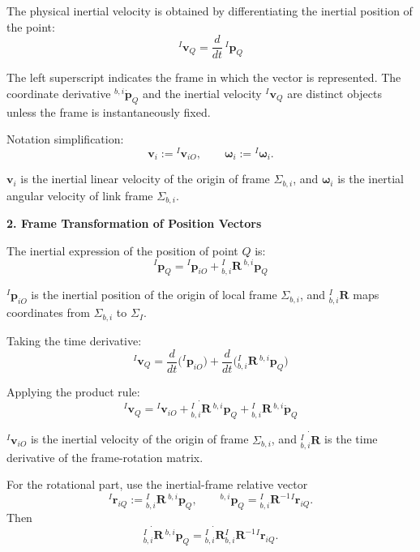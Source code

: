 \documentclass[12pt,a4paper]{report}
\newcommand{\newsymbols}[1]{\par\noindent{}#1\par\vspace{0.35em}}
\newcommand{\vect}[1]{\mathbf{#1}}
\newcommand{\Frame}[1]{\Sigma_{#1}}
\newcommand{\Rot}[2]{{}_{#1}^{#2}\mathbf{R}}
\newcommand{\angvel}{\boldsymbol{\omega}}
\begin{document}
The physical inertial velocity is obtained by differentiating the inertial position of the point:
\begin{equation}
{}^{I}\vect{v}_{Q}
=
\frac{d}{dt}\,{}^{I}\vect{p}_{Q}
\end{equation}
\newsymbols{The left superscript indicates the frame in which the vector is represented. The coordinate derivative ${}^{b,i}\dot{\vect{p}}_{Q}$ and the inertial velocity ${}^{I}\vect{v}_{Q}$ are distinct objects unless the frame is instantaneously fixed.}

Notation simplification:
\begin{equation}
\vect{v}_{i} := {}^{I}\vect{v}_{iO},
\qquad
\angvel_{i} := {}^{I}\angvel_{i}.
\end{equation}
\newsymbols{$\vect{v}_{i}$ is the inertial linear velocity of the origin of frame $\Frame{b,i}$, and $\angvel_{i}$ is the inertial angular velocity of link frame $\Frame{b,i}$.}

\textbf{2. Frame Transformation of Position Vectors}

The inertial expression of the position of point $Q$ is:
\begin{equation}
{}^{I}\vect{p}_{Q}
=
{}^{I}\vect{p}_{iO}
+
\Rot{b,i}{I}\,{}^{b,i}\vect{p}_{Q}
\end{equation}
\newsymbols{${}^{I}\vect{p}_{iO}$ is the inertial position of the origin of local frame $\Frame{b,i}$, and $\Rot{b,i}{I}$ maps coordinates from $\Frame{b,i}$ to $\Frame{I}$.}

Taking the time derivative:
\begin{equation}
{}^{I}\vect{v}_{Q}
=
\frac{d}{dt}\bigl({}^{I}\vect{p}_{iO}\bigr)
+
\frac{d}{dt}\bigl(\Rot{b,i}{I}\,{}^{b,i}\vect{p}_{Q}\bigr)
\end{equation}

Applying the product rule:
\begin{equation}
{}^{I}\vect{v}_{Q}
=
{}^{I}\vect{v}_{iO}
+
\dot{\Rot{b,i}{I}}\,{}^{b,i}\vect{p}_{Q}
+
\Rot{b,i}{I}\,{}^{b,i}\dot{\vect{p}}_{Q}
\end{equation}
\newsymbols{${}^{I}\vect{v}_{iO}$ is the inertial velocity of the origin of frame $\Frame{b,i}$, and $\dot{\Rot{b,i}{I}}$ is the time derivative of the frame-rotation matrix.}

For the rotational part, use the inertial-frame relative vector
\begin{equation*}
{}^{I}\vect{r}_{iQ}
:=
\Rot{b,i}{I}\,{}^{b,i}\vect{p}_{Q},
\qquad
{}^{b,i}\vect{p}_{Q}
=
\Rot{b,i}{I}^{-1}{}^{I}\vect{r}_{iQ}.
\end{equation*}
Then
\begin{equation}
\dot{\Rot{b,i}{I}}\,{}^{b,i}\vect{p}_{Q}
=
\dot{\Rot{b,i}{I}}\Rot{b,i}{I}^{-1}{}^{I}\vect{r}_{iQ}.
\end{equation}
\end{document}
